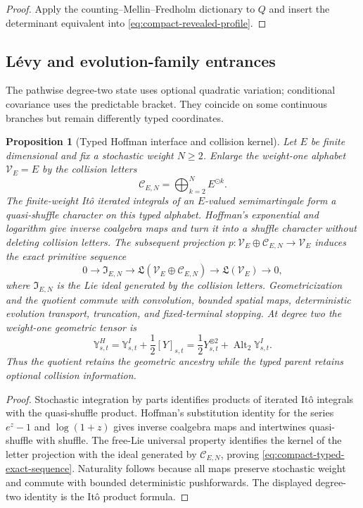\documentclass[10pt,reqno]{amsart}
\theoremstyle{plain}
\newtheorem{proposition}[theorem]{Proposition}
\theoremstyle{definition}
\theoremstyle{remark}
\begin{document}
\begin{proof}
Apply the counting--Mellin--Fredholm dictionary
 to $Q$ and insert the determinant equivalent
into \eqref{eq:compact-revealed-profile}.
\end{proof}

\subsection{L\'evy and evolution-family entrances}

The pathwise degree-two state uses optional quadratic variation; conditional
covariance uses the predictable bracket.  They coincide on some continuous
branches but remain differently typed coordinates.


\begin{proposition}[Typed Hoffman interface and collision kernel]
\label{prop:compact-Hoffman-interface}
Let $E$ be finite dimensional and fix a stochastic weight $N\ge2$.  Enlarge
the weight-one alphabet $\mathscr V_E=E$ by the collision letters
\[
 \mathscr C_{E,N}=\bigoplus_{k=2}^N E^{\odot k}.
\]
The finite-weight It\^o iterated integrals of an $E$-valued semimartingale
form a quasi-shuffle character on this typed alphabet.  Hoffman's exponential
and logarithm give inverse coalgebra maps and turn it into a shuffle
character without deleting collision letters.  The subsequent projection
$p:\mathscr V_E\oplus\mathscr C_{E,N}\to\mathscr V_E$ induces the exact
primitive sequence
\begin{equation}
 0\longrightarrow\mathfrak I_{E,N}
 \longrightarrow\mathfrak L(\mathscr V_E\oplus\mathscr C_{E,N})
 \longrightarrow\mathfrak L(\mathscr V_E)\longrightarrow0,
 \label{eq:compact-typed-exact-sequence}
\end{equation}
where $\mathfrak I_{E,N}$ is the Lie ideal generated by the collision
letters.  Geometricization and the quotient commute with convolution,
bounded spatial maps, deterministic evolution transport, truncation, and
fixed-terminal stopping.  At degree two the weight-one geometric tensor is
\[
 \mathbb Y^H_{s,t}=\mathbb Y^I_{s,t}+\frac12[Y]_{s,t}
 =\frac12Y_{s,t}^{\otimes2}+\operatorname{Alt}_2\mathbb Y^I_{s,t}.
\]
Thus the quotient retains the geometric ancestry while the typed parent
retains optional collision information.
\end{proposition}

\begin{proof}
Stochastic integration by parts identifies products of iterated It\^o
integrals with the quasi-shuffle product.  Hoffman's substitution identity
for the series $e^z-1$ and $\log(1+z)$ gives inverse coalgebra maps and
intertwines quasi-shuffle with shuffle.  The free-Lie universal property
identifies the kernel of the letter projection with the ideal generated by
$\mathscr C_{E,N}$, proving \eqref{eq:compact-typed-exact-sequence}.
Naturality follows because all maps preserve stochastic weight and commute
with bounded deterministic pushforwards.  The displayed degree-two identity
is the It\^o product formula.
\end{proof}
\end{document}

